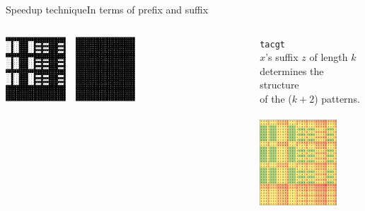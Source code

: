 \documentclass[pdf,xcolor={dvipsnames}]{beamer}
\begin{document}
\begin{frame}{Speedup technique}{In terms of prefix and suffix}
\begin{columns}[t]
\begin{column}{0.5\textwidth}
			\includegraphics[width=0.25\textwidth]{img/4.png}\ \ \includegraphics[width=0.25\textwidth]{img/5.png}\\

			\end{column}

			\begin{column}{0.5\textwidth}
			\centering
			\texttt{\color{red}\Huge tacgt}\\
			$x$'s {\color{red}suffix $z$} of length $k$\\
			determines the structure\\
			of the ($k+2$) patterns.\\\ \\
			\includegraphics[width=0.75\textwidth]{img/D(tacgt)}

			\end{column}
		\end{columns}
	\end{frame}
\end{document}
